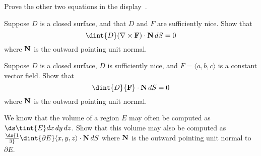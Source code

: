 \begin{exercises}
\exercise Prove the other two equations in the 
display~.

\exercise Suppose $D$ is a closed surface, and that $D$ and $F$ are
sufficiently nice. Show that 
$$\dint{D} (\nabla \times {\bf F}) \cdot {\bf N}\, dS = 0$$
where $\bf N$ is the outward pointing unit normal.

\exercise Suppose $D$ is a closed surface, $D$ is sufficiently nice,
and $F=\langle a,b,c\rangle$ is a constant vector field.
Show that 
$$\dint{D} {\bf F} \cdot {\bf N}\, dS = 0$$
where $\bf N$ is the outward pointing unit normal.

\exercise We know that the volume of a region $E$ may often be computed as
$\ds \tint{E}dx\,dy\,dz$. Show that this volume may also be computed as
$\ds{1\over3} \dint{\partial E} \langle x,y,z\rangle \cdot {\bf N}\,dS$
where ${\bf N}$ is the outward pointing unit normal to $\partial E$.

\end{exercises}
